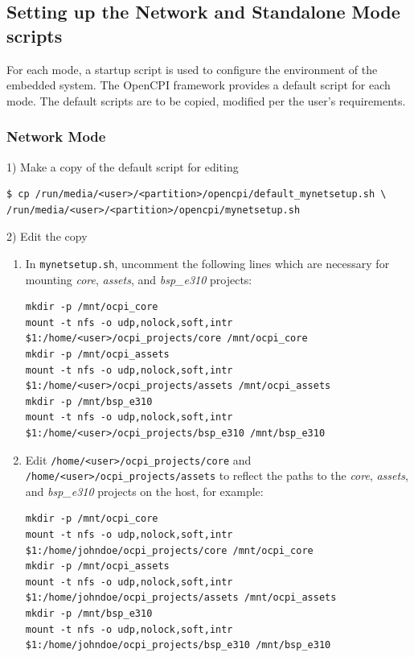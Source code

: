 \begin{flushleft}

\subsection{Setting up the Network and Standalone Mode scripts}

For each mode, a startup script is used to configure the environment of the embedded system. The OpenCPI framework provides a default script for each mode. The default scripts are to be copied, modified per the user's requirements.\par\medskip

\subsubsection{Network Mode}
1) Make a copy of the default script for editing
\begin{verbatim}
$ cp /run/media/<user>/<partition>/opencpi/default_mynetsetup.sh \
/run/media/<user>/<partition>/opencpi/mynetsetup.sh
\end{verbatim}\medskip

2) Edit the copy
\begin{enumerate}
\item In \texttt{mynetsetup.sh}, uncomment the following lines which are necessary for mounting \textit{core}, \textit{assets}, and \textit{bsp\_e310} projects:

\begin{verbatim}
mkdir -p /mnt/ocpi_core
mount -t nfs -o udp,nolock,soft,intr $1:/home/<user>/ocpi_projects/core /mnt/ocpi_core
mkdir -p /mnt/ocpi_assets
mount -t nfs -o udp,nolock,soft,intr $1:/home/<user>/ocpi_projects/assets /mnt/ocpi_assets
mkdir -p /mnt/bsp_e310
mount -t nfs -o udp,nolock,soft,intr $1:/home/<user>/ocpi_projects/bsp_e310 /mnt/bsp_e310
\end{verbatim}
 \item Edit \texttt{/home/<user>/ocpi\_projects/core} and \texttt{/home/<user>/ocpi\_projects/assets} to reflect the paths to the \textit{core}, \textit{assets}, and \textit{bsp\_e310} projects on the host, for example:
\begin{verbatim}
mkdir -p /mnt/ocpi_core
mount -t nfs -o udp,nolock,soft,intr $1:/home/johndoe/ocpi_projects/core /mnt/ocpi_core
mkdir -p /mnt/ocpi_assets
mount -t nfs -o udp,nolock,soft,intr $1:/home/johndoe/ocpi_projects/assets /mnt/ocpi_assets
mkdir -p /mnt/bsp_e310
mount -t nfs -o udp,nolock,soft,intr $1:/home/johndoe/ocpi_projects/bsp_e310 /mnt/bsp_e310
\end{verbatim}
\end{enumerate}


\end{flushleft}
